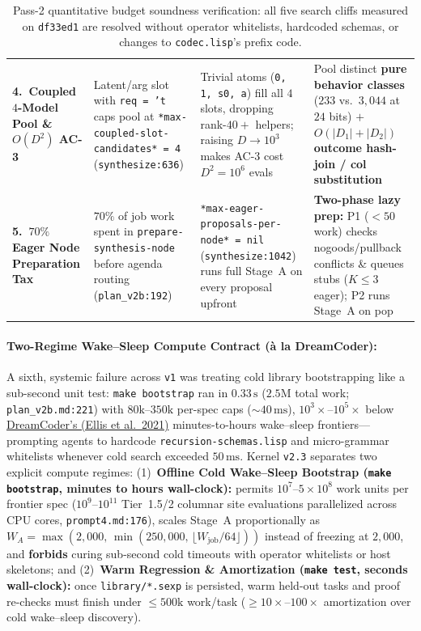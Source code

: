 \documentclass[12pt]{article}
\newcommand{\litref}[2]{\hyperlink{lit:#1}{\textcolor{citegreen}{#2}}}
\begin{document}
\begin{table}[htbp]
\begin{tabular}{@{}L{2.55cm}L{4.35cm}L{4.55cm}L{4.15cm}@{}}
\addlinespace[2pt]
\textbf{4.~Coupled $4$-Model Pool \& $O(D^2)$ AC-3} & Latent/arg slot with \texttt{req = 't} caps pool at \texttt{*max-coupled-\allowbreak slot-\allowbreak candidates* = 4} (\texttt{synthesize:636}) & Trivial atoms (\texttt{0, 1, s0, a}) fill all $4$ slots, dropping rank-$40+$ helpers; raising $D\to 10^3$ makes AC-3 cost $D^2 = 10^6$ evals & Pool distinct \textbf{pure behavior classes} ($233$ vs.\ $3,044$ at $24$ bits) $+$ \textbf{$O(|D_1|+|D_2|)$ outcome hash-join / col substitution} \\
\addlinespace[2pt]
\textbf{5.~$70\%$ Eager Node Preparation Tax} & $70\%$ of job work spent in \texttt{prepare-synthesis-node} before agenda routing (\texttt{plan\_v2b:192}) & \texttt{*max-eager-\allowbreak proposals-\allowbreak per-node* = nil} (\texttt{synthesize:1042}) runs full Stage~A on every proposal upfront & \textbf{Two-phase lazy prep:} P1 ($<50$ work) checks nogoods/pullback conflicts \& queues stubs ($K\le 3$ eager); P2 runs Stage~A on pop \\
\bottomrule
\end{tabular}
\caption{Pass-2 quantitative budget soundness verification: all five search cliffs measured on \texttt{df33ed1} are resolved without operator whitelists, hardcoded schemas, or changes to \texttt{codec.lisp}'s prefix code.}
\label{tab:budgets}
\end{table}

\paragraph{Two-Regime Wake--Sleep Compute Contract (\`a la DreamCoder):}
A sixth, systemic failure across \texttt{v1} was treating cold library bootstrapping like a sub-second unit test: \texttt{make bootstrap} ran in $0.33\,\mathrm{s}$ ($2.5\mathrm{M}$ total work; \texttt{plan\_v2b.md:221}) with $80\mathrm{k}$--$350\mathrm{k}$ per-spec caps ($\sim 40\,\mathrm{ms}$), $10^3\times$--$10^5\times$ below \litref{ellis2021}{DreamCoder's (Ellis et al.\ 2021)} minutes-to-hours wake--sleep frontiers---prompting agents to hardcode \texttt{recursion-schemas.lisp} and micro-grammar whitelists whenever cold search exceeded $50\,\mathrm{ms}$. Kernel \texttt{v2.3} separates two explicit compute regimes:
(1)~\textbf{Offline Cold Wake--Sleep Bootstrap (\texttt{make bootstrap}, minutes to hours wall-clock):} permits $10^7$--$5\times 10^8$ work units per frontier spec ($10^9$--$10^{11}$ Tier~1.5/2 columnar site evaluations parallelized across CPU cores, \texttt{prompt4.md:176}), scales Stage~A proportionally as $W_A = \max(2{,}000,\,\min(250{,}000,\,\lfloor W_{\mathrm{job}}/64\rfloor))$ instead of freezing at $2{,}000$, and \textbf{forbids} curing sub-second cold timeouts with operator whitelists or host skeletons; and
(2)~\textbf{Warm Regression \& Amortization (\texttt{make test}, seconds wall-clock):} once \texttt{library/*.sexp} is persisted, warm held-out tasks and proof re-checks must finish under $\le 500\mathrm{k}$ work/task ($\ge 10\times$--$100\times$ amortization over cold wake--sleep discovery).
\end{document}
